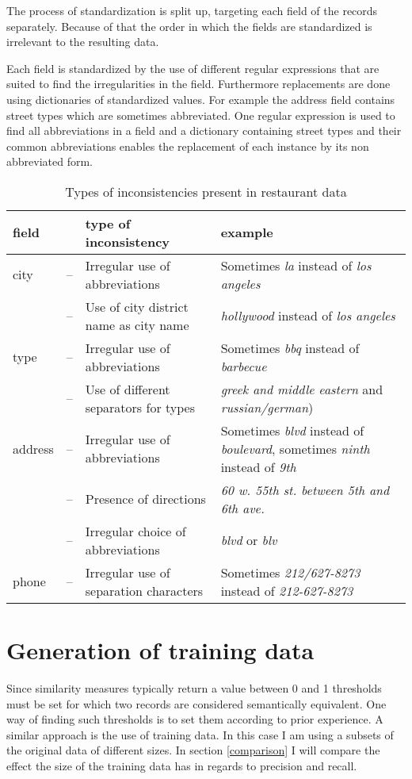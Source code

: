 \documentclass[conference]{IEEEtran}
\begin{document}
The process of standardization is split up, targeting each field of the records separately. Because of that the order in which the fields are standardized is irrelevant to the resulting data.

Each field is standardized by the use of different regular expressions that are suited to find the irregularities in the field. Furthermore replacements are done using dictionaries of standardized values. For example the address field contains street types which are sometimes abbreviated. One regular expression is used to find all abbreviations in a field and a dictionary containing street types and their common abbreviations enables the replacement of each instance by its non abbreviated form.
\begin{table}
	\begin{tabularx}{\columnwidth}{lr@{ }XX}
	\toprule
	field &&type of inconsistency & example \\
	\midrule
	city & --&Irregular use of abbreviations &Sometimes \emph{la} instead of \emph{los angeles}\\\rule[.2ex]{0pt}{2.5ex}
		 & --&Use of city district name as city name& \emph{hollywood} instead of \emph{los angeles}\\
	\midrule
	type & --& Irregular use of abbreviations  &Sometimes \emph{bbq} instead of \emph{barbecue}\\\rule[.2ex]{0pt}{2.5ex}
		 & --& Use of different separators for types & \emph{greek and middle eastern} and \emph{russian/german})\\
	\midrule
	address & --&Irregular use of abbreviations &Sometimes \emph{blvd} instead of \emph{boulevard}, sometimes \emph{ninth} instead of \emph{9th}\\\rule[.2ex]{0pt}{2.5ex}
	 & --&Presence of directions & \emph{60 w. 55th st. between 5th and 6th ave.}\\\rule[.2ex]{0pt}{2.5ex}
	 & --& Irregular choice of abbreviations & \emph{blvd} or \emph{blv}\\
	\midrule
	phone & --& Irregular use of separation characters  & Sometimes \emph{212/627-8273} instead of \emph{212-627-8273}\\
	\bottomrule
	\end{tabularx}
	\caption{Types of inconsistencies present in restaurant data}\label{rec_faults}
\end{table}

\section{Generation of training data}\label{train_gen}
Since similarity measures typically return a value between 0 and 1 thresholds must be set for which two records are considered semantically equivalent. One way of finding such thresholds is to set them according to prior experience. A similar approach is the use of training data. In this case I am using a subsets of the original data of different sizes. In section \ref{comparison} I will compare the effect the size of the training data has in regards to precision and recall. 
\end{document}
